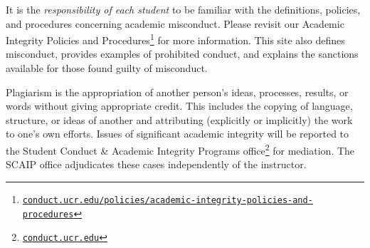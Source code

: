 \documentclass[12pt]{article}
\newcommand{\footlink}[1]{\footnote{\href{https://#1}{\texttt{#1}}}}
\newcommand\acro[1]{{\small {#1}}}
\numberwithin{equation}{section}    %
\begin{document}
It is the \emph{responsibility of each student} to be familiar with the definitions, policies, and procedures concerning academic misconduct. Please revisit our Academic Integrity Policies and Procedures\footlink{conduct.ucr.edu/policies/academic-integrity-policies-and-procedures} for more information. This site also defines misconduct, provides examples of prohibited conduct, and explains the sanctions available for those found guilty of misconduct.

Plagiarism is the appropriation of another person's ideas, processes, results, or words without giving appropriate credit. This includes the copying of language, structure, or ideas of another and attributing (explicitly or implicitly) the work to one's own efforts. Issues of significant academic integrity will be reported to the Student Conduct \& Academic Integrity Programs office\footlink{conduct.ucr.edu} for mediation. The \acro{SCAIP} office adjudicates these cases independently of the instructor.
\end{document}
